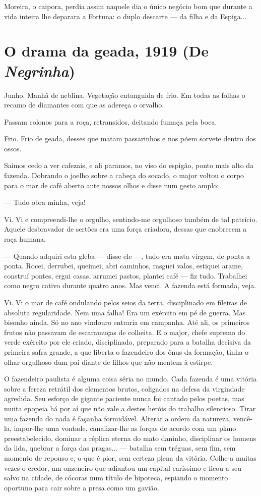 Moreira, o caipora, perdia assim naquele dia o único negócio bom que
durante a vida inteira lhe deparara a Fortuna: o duplo descarte --- da
filha e da Espiga...

\chapter{O drama da geada, 1919 (De \emph{Negrinha})}

Junho. Manhã de neblina. Vegetação entanguida de frio. Em todas as
folhas o recamo de diamantes com que as adereça o orvalho.

Passam colonos para a roça, retransidos, deitando fumaça pela boca.

Frio. Frio de geada, desses que matam passarinhos e nos põem sorvete
dentro dos ossos.

Saímos cedo a ver cafezais, e ali paramos, no viso do espigão, ponto
mais alto da fazenda. Dobrando o joelho sobre a cabeça do socado, o
major voltou o corpo para o mar de café aberto ante nossos olhos e disse
num gesto amplo:

--- Tudo obra minha, veja!

Vi. Vi e compreendi-lhe o orgulho, sentindo-me orgulhoso também de tal
patrício. Aquele desbravador de sertões era uma força criadora, dessas
que enobrecem a raça humana.

--- Quando adquiri esta gleba --- disse ele ---, tudo era mata virgem,
de ponta a ponta. Rocei, derrubei, queimei, abri caminhos, rasguei
valos, estiquei arame, construí pontes, ergui casas, arrumei pastos,
plantei café --- fiz tudo. Trabalhei como negro cativo durante quatro
anos. Mas venci. A fazenda está formada, veja.

Vi. Vi o mar de café ondulando pelos seios da terra, disciplinado em
fileiras de absoluta regularidade. Nem uma falha! Era um exército em pé
de guerra. Mas bisonho ainda. Só no ano vindouro entraria em campanha.
Até ali, os primeiros frutos não passavam de escaramuças de colheita. E
o major, chefe supremo do verde exército por ele criado, disciplinado,
preparado para a batalha decisiva da primeira safra grande, a que
liberta o fazendeiro dos ônus da formação, tinha o olhar orgulhoso dum
pai diante de filhos que não mentem à estirpe.

O fazendeiro paulista é alguma coisa séria no mundo. Cada fazenda é uma
vitória sobre a fereza retrátil dos elementos brutos, coligados na
defesa da virgindade agredida. Seu esforço de gigante paciente nunca foi
cantado pelos poetas, mas muita epopeia há por aí que não vale a destes
heróis do trabalho silencioso. Tirar uma fazenda do nada é façanha
formidável. Alterar a ordem da natureza, vencê-la, impor-lhe uma
vontade, canalizar-lhe as forças de acordo com um plano preestabelecido,
dominar a réplica eterna do mato daninho, disciplinar os homens da lida,
quebrar a força das pragas... --- batalha sem tréguas, sem fim, sem
momento de repouso e, o que é pior, sem certeza plena da vitória.
Colhe-a muitas vezes o credor, um onzeneiro que adiantou um capital
caríssimo e ficou a seu salvo na cidade, de cócoras num título de
hipoteca, espiando o momento oportuno para cair sobre a presa como um
gavião.

